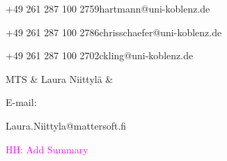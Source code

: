 \documentclass[external]{20120615_deliverable_template_ukob}
\theoremstyle{definition}
\newcommand{\todo}[2]{\textcolor{magenta}{#1: #2}}
\begin{document}
\begin{LGhistory}

\end{LGhistory}


\newcommand{\LGaddauthorNoPhone}[3]{\hline  #1 &  #2 & %
   \parbox{3em}{E-mail:} \small #3 \\
}

\begin{LGauthors}

%
{+49 261 287 100 2759}{\small hartmann@uni-koblenz.de}

%
{+49 261 287 100 2786}{\small chrisschaefer@uni-koblenz.de}

%
{+49 261 287 100 2702}{\small ckling@uni-koblenz.de}

\LGaddauthorNoPhone{MTS}{Laura Niittyl\"a}%
{\small Laura.Niittyla@mattersoft.fi}

\end{LGauthors}



\begin{LGExecutiveSummary}
  \vspace{10pt} 

\todo{HH}{Add Summary}

\end{LGExecutiveSummary}
\end{document}
